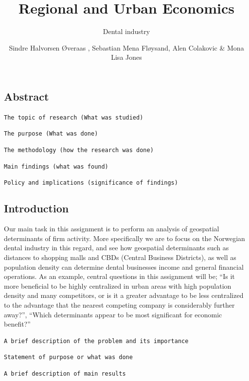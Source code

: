 \documentclass[
  10,
  a4paper,
]{article}
\title{Regional and Urban Economics}
\subtitle{Dental industry}
\author{Sindre Halvorsen Øveraas , Sebastian Mena Fløysand, Alen
Colakovic \& Mona Lisa Jones}
\date{}
\begin{document}
\maketitle
\ifdefined\Shaded\renewenvironment{Shaded}{\begin{tcolorbox}[sharp corners, borderline west={3pt}{0pt}{shadecolor}, frame hidden, interior hidden, boxrule=0pt, enhanced, breakable]}{\end{tcolorbox}}\fi

\hypertarget{abstract}{%
\subsection{Abstract}\label{abstract}}

\texttt{The\ topic\ of\ research\ (What\ was\ studied)}

\texttt{The\ purpose\ (What\ was\ done)}

\texttt{The\ methodology\ (how\ the\ research\ was\ done)}

\texttt{Main\ findings\ (what\ was\ found)}

\texttt{Policy\ and\ implications\ (significance\ of\ findings)}

\hypertarget{introduction}{%
\subsection{Introduction}\label{introduction}}

Our main task in this assignment is to perform an analysis of geospatial
determinants of firm activity. More specifically we are to focus on the
Norwegian dental industry in this regard, and see how geospatial
determinants such as distances to shopping malls and CBDs (Central
Business Districts), as well as population density can determine dental
businesses income and general financial operations. As an example,
central questions in this assignment will be; ``Is it more beneficial to
be highly centralized in urban areas with high population density and
many competitors, or is it a greater advantage to be less centralized to
the advantage that the nearest competing company is considerably further
away?'', ``Which determinants appear to be most significant for economic
benefit?''

\texttt{A\ brief\ description\ of\ the\ problem\ and\ its\ importance}

\texttt{Statement\ of\ purpose\ or\ what\ was\ done}

\texttt{A\ brief\ description\ of\ main\ results}
\end{document}
